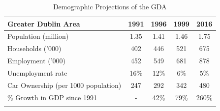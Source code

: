 \begin{table}[htbp]
    \footnotesize{}  \vspace{10pt} \begin{longtable} {p{190pt}cccc}
        \caption{Demographic Projections of the GDA}                                 \\
        \hline

        \textbf{Greater Dublin Area} &

        \textbf{1991}                & \textbf{1996} & \textbf{1999} & \textbf{2016} \\* \hline \hline {Population
        (million) }                  &

        {1.35}                       & {1.41}        & {1.46}        & {1.75}        \\* \hline {Households ('000) } &

        {402}                        & {446}         & {521}         & {675}         \\* \hline {Employment ('000) } &

        {452}                        & {549}         & {681}         & {878}         \\* \hline {Unemployment rate } &

        {16{\%}}                     & {12{\%}}      & {6{\%}}       & {5{\%}}       \\* \hline {Car Ownership (per 1000 population)} &

        {247}                        & {292}         & {342}         & {480}         \\* \hline {{\%} Growth in GDP since 1991} & {- } & {42{\%}} & {79{\%}} &
        {260{\%} }                                                                   \\* \hline

        \label{Table: Demographic Projections of the GDA}
    \end{longtable}
    \normalsize{} 
\end{table}

\newpage

